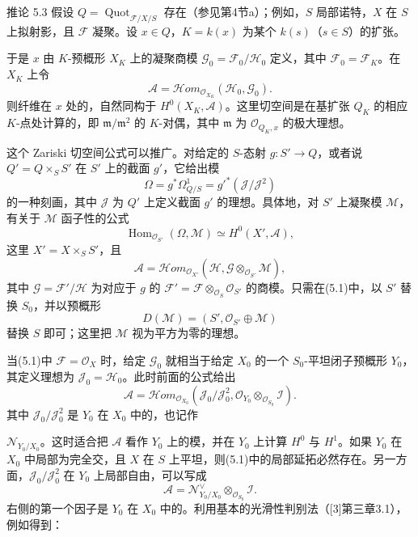 \begin{statement}{推论 5.3}
假设 $Q=\operatorname{Quot}_{\mathcal F/X/S}$ 存在（参见第4节a）；例如，$S$ 局部诺特，$X$ 在 $S$ 上拟射影，且 $\mathcal F$ 凝聚。设 $x\in Q$，$K=k(x)$ 为某个 $k(s)$（$s\in S$）的扩张。

于是 $x$ 由 $K$-预概形 $X_K$ 上的凝聚商模 $\mathcal G_0=\mathcal F_0/\mathcal H_0$ 定义，其中 $\mathcal F_0=\mathcal F_K$。在 $X_K$ 上令
\[
\mathcal A=\mathcal{H}om_{\mathcal O_{X_K}}(\mathcal H_0,\mathcal G_0).
\]
则纤维在 $x$ 处的，自然同构于 $H^0(X_K,\mathcal A)$。这里切空间是在基扩张 $Q_K$ 的相应 $K$-点处计算的，即 $\mathfrak m/\mathfrak m^2$ 的 $K$-对偶，其中 $\mathfrak m$ 为 $\mathcal O_{Q_K,x}$ 的极大理想。
\end{statement}
这个 Zariski 切空间公式可以推广。对给定的 $S$-态射 $g:S'\to Q$，或者说 $Q'=Q\times_SS'$ 在 $S'$ 上的截面 $g'$，它给出模
\[
\Omega=g^*\Omega^1_{Q/S}=g'^*(\mathcal J/\mathcal J^2)
\]
的一种刻画，其中 $\mathcal J$ 为 $Q'$ 上定义截面 $g'$ 的理想。具体地，对 $S'$ 上凝聚模 $\mathcal M$，有关于 $\mathcal M$ 函子性的公式
\[
\operatorname{Hom}_{\mathcal O_{S'}}(\Omega,\mathcal M)
\simeq H^0(X',\mathcal A),
\]
这里 $X'=X\times_SS'$，且
\[
\mathcal A=\mathcal{H}om_{\mathcal O_{X'}}
(\mathcal H,\mathcal G\otimes_{\mathcal O_{S'}}\mathcal M),
\]
其中 $\mathcal G=\mathcal F'/\mathcal H$ 为对应于 $g$ 的 $\mathcal F'=\mathcal F\otimes_{\mathcal O_S}\mathcal O_{S'}$ 的商模。只需在(5.1)中，以 $S'$ 替换 $S_0$，并以预概形
\[
D(\mathcal M)=(S',\mathcal O_{S'}\oplus\mathcal M)
\]
替换 $S$ 即可；这里把 $\mathcal M$ 视为平方为零的理想。

当(5.1)中 $\mathcal F=\mathcal O_X$ 时，给定 $\mathcal G_0$ 就相当于给定 $X_0$ 的一个 $S_0$-平坦闭子预概形 $Y_0$，其定义理想为 $\mathcal J_0=\mathcal H_0$。此时前面的公式给出
\[
\mathcal A=\mathcal{H}om_{\mathcal O_{X_0}}
\left(\mathcal J_0/\mathcal J_0^2,
\mathcal O_{Y_0}\otimes_{\mathcal O_{S_0}}\mathcal I\right).
\]
其中 $\mathcal J_0/\mathcal J_0^2$ 是 $Y_0$ 在 $X_0$ 中的，也记作

$\mathcal N_{Y_0/X_0}$。这时适合把 $\mathcal A$ 看作 $Y_0$ 上的模，并在 $Y_0$ 上计算 $H^0$ 与 $H^1$。如果 $Y_0$ 在 $X_0$ 中局部为完全交，且 $X$ 在 $S$ 上平坦，则(5.1)中的局部延拓必然存在。另一方面，$\mathcal J_0/\mathcal J_0^2$ 在 $Y_0$ 上局部自由，可以写成
\[
\mathcal A=\mathcal N^\vee_{Y_0/X_0}
\otimes_{\mathcal O_{S_0}}\mathcal I.
\]
右侧的第一个因子是 $Y_0$ 在 $X_0$ 中的。利用基本的光滑性判别法（[3]第三章3.1），例如得到：

